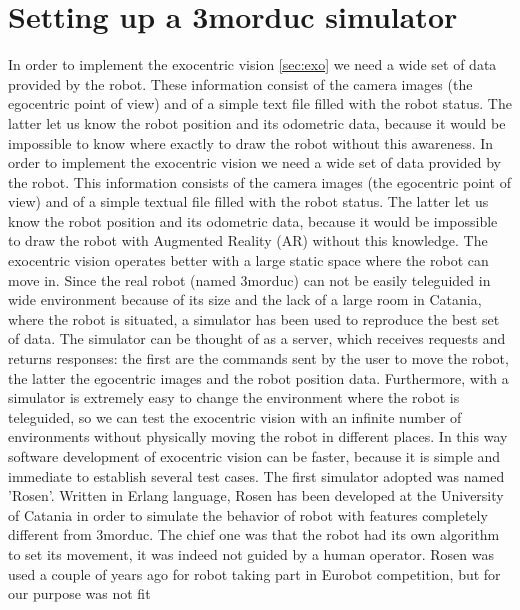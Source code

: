 \section{Setting up a 3morduc simulator}
\label{sec:simulator}
In order to implement the exocentric vision \ref{sec:exo} 
we need a wide set of data provided by the robot.
These information consist of the camera images 
(the egocentric point of view) and of a simple 
text file filled with the robot status. The latter 
let us know the robot position and its odometric 
data, because it would be impossible to know where 
exactly to draw the robot without this awareness.
%
In order to implement the exocentric vision \cite{sec:exo} we need a wide set of data provided by the robot.
This information consists of the camera images (the egocentric point of view) and of a simple textual file filled with 
the robot status. The latter let us know the robot position and its odometric data, because it would be impossible to draw 
the robot with Augmented Reality (AR) without this knowledge.
\newline The exocentric vision operates better with a large static space where the robot can move in. Since the real robot 
(named 3morduc) can not be easily teleguided in wide environment because of its size and the lack of a large room in Catania, 
where the robot is situated, a simulator has been used to reproduce the best set of data. The simulator can be thought of as 
a server, which receives requests and returns responses: the first are the commands sent by the user to move the robot, the
latter the egocentric images and the robot position data.
\newline Furthermore, with a simulator is extremely easy to change the environment where the robot is teleguided, so we can test
the exocentric vision with an infinite number of environments without physically moving the robot in different places. In this way
software development of exocentric vision can be faster, because it is simple and immediate to establish several test cases.
\newline The first simulator adopted was named 'Rosen'. Written in Erlang language, Rosen has been developed at the University
of Catania in order to simulate the behavior of robot with features completely different from 3morduc. The chief one was that
the robot had its own algorithm to set its movement, it was indeed not guided by a human operator.
\newline Rosen was used a couple of years ago for robot taking part in Eurobot competition, but for our purpose was not fit
